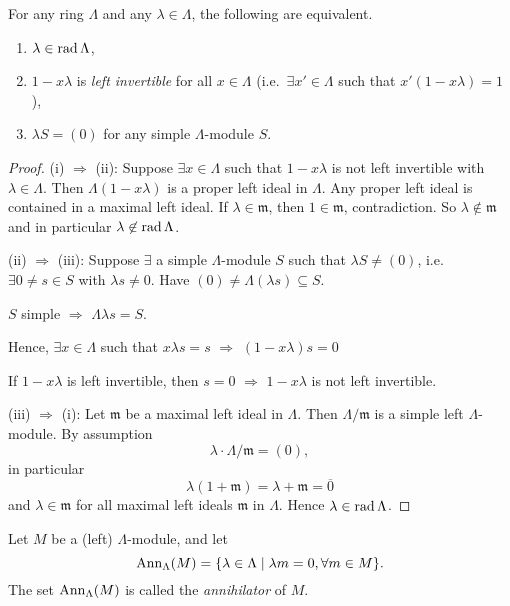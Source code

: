 \begin{prop}\label{prop:16}
For any ring $\Lambda$ and any $\lambda\in\Lambda$, the following are
equivalent.
\begin{enumerate}[\rm(i)]
\item $\lambda\in\operatorname{rad}\nolimits\Lambda$, 
\item $1 - x\lambda$ is \emph{left invertible} for all $x\in \Lambda$
  (i.e.\ $\exists x'\in\Lambda$ such that $x'(1-x\lambda) = 1$), 
\item $\lambda S = (0)$ for any simple $\Lambda$-module $S$.
\end{enumerate}
\end{prop}
\begin{proof}
(i) $\Rightarrow$ (ii): Suppose $\exists x \in \Lambda$ such that $1 -
x\lambda$ is not left invertible with $\lambda\in\Lambda$.  Then
$\Lambda(1 - x\lambda)$ is a proper left ideal in $\Lambda$.  Any
proper left ideal is contained in a maximal left ideal.  If
$\lambda\in\mathfrak{m}$, then $1\in\mathfrak{m}$, contradiction. So
$\lambda\not\in\mathfrak{m}$ and in particular
$\lambda\not\in\operatorname{rad}\nolimits\Lambda$. 

(ii) $\Rightarrow$ (iii): Suppose $\exists$ a simple $\Lambda$-module
$S$ such that $\lambda S \neq (0)$, i.e.\ $\exists 0\neq s \in S$ with
$\lambda s \neq 0$.  Have $(0)\neq \Lambda(\lambda s)\subseteq S$.  

$S$ simple $\Rightarrow$ $\Lambda \lambda s = S$.

Hence, $\exists x \in \Lambda$ such that $x\lambda s = s$
$\Rightarrow$ $(1 - x\lambda) s = 0$

If $1 - x\lambda$ is left invertible, then $s=0$ $\Rightarrow$
$1-x\lambda$ is not left invertible.

(iii) $\Rightarrow$ (i): Let $\mathfrak{m}$ be a maximal left ideal in
$\Lambda$.  Then $\Lambda/\mathfrak{m}$ is a simple left
$\Lambda$-module.  By assumption
\[\lambda\cdot \Lambda/\mathfrak{m} = (0),\]
in particular
\[\lambda(1 + \mathfrak{m}) = \lambda + \mathfrak{m} = \overline{0}\]
and $\lambda\in\mathfrak{m}$ for all maximal left ideals
$\mathfrak{m}$ in $\Lambda$.   Hence $\lambda\in\operatorname{rad}\nolimits\Lambda$. 
\end{proof}

\begin{defin}
Let $M$ be a (left) $\Lambda$-module, and let 
\[\operatorname{Ann}\nolimits_\Lambda(M) = \{\lambda\in\Lambda\mid \lambda m = 0, \forall
  m\in M\}.\]
The set $\operatorname{Ann}\nolimits_\Lambda(M)$ is called the
\emph{annihilator} of
$M$. 
\end{defin}

